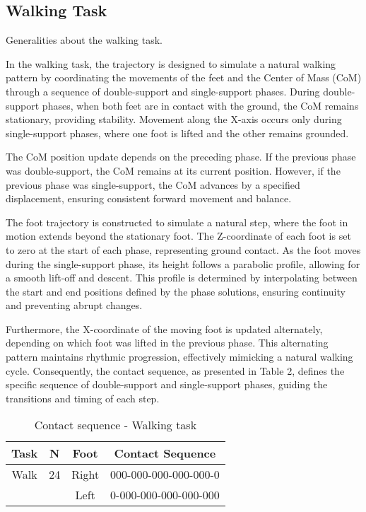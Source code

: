 \documentclass[main.tex]{subfiles}
\begin{document}
\subsection{Walking Task}
Generalities about the walking task.

In the walking task, the trajectory is designed to simulate a natural walking pattern by coordinating the movements of the feet and the Center of Mass (CoM) through a sequence of double-support and single-support phases. During double-support phases, when both feet are in contact with the ground, the CoM remains stationary, providing stability. Movement along the X-axis occurs only during single-support phases, where one foot is lifted and the other remains grounded.

The CoM position update depends on the preceding phase. If the previous phase was double-support, the CoM remains at its current position. However, if the previous phase was single-support, the CoM advances by a specified displacement, ensuring consistent forward movement and balance.

The foot trajectory is constructed to simulate a natural step, where the foot in motion extends beyond the stationary foot. The Z-coordinate of each foot is set to zero at the start of each phase, representing ground contact. As the foot moves during the single-support phase, its height follows a parabolic profile, allowing for a smooth lift-off and descent. This profile is determined by interpolating between the start and end positions defined by the phase solutions, ensuring continuity and preventing abrupt changes.

Furthermore, the X-coordinate of the moving foot is updated alternately, depending on which foot was lifted in the previous phase. This alternating pattern maintains rhythmic progression, effectively mimicking a natural walking cycle. Consequently, the contact sequence, as presented in Table 2, defines the specific sequence of double-support and single-support phases, guiding the transitions and timing of each step.

\begin{table}[h!]
    \label{tab:walkingtask}
    \centering
    \begin{tabular}{|c|c|c|c|}
        \hline
        Task & N & Foot & Contact Sequence \\
        \hline
        Walk & 24 & Right & 000-000-000-000-000-0 \\
        & & Left & 0-000-000-000-000-000 \\
        \hline
    \end{tabular}
    \caption{Contact sequence - Walking task}
\end{table}
\end{document}

